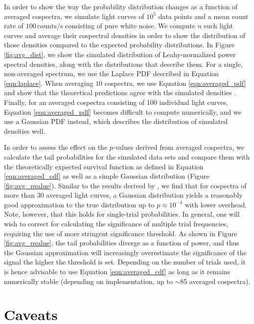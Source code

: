 \documentclass[12pt]{emulateapj}
\begin{document}
In order to show the way the probability distribution changes as a function of averaged cospectra, we simulate light curves of $10^{5}$ data points and a mean count rate of $100\,\mathrm{counts}/\mathrm{s}$ consisting of pure white noise. We compute $n$ such light curves and average their cospectral densities in order to show the distribution of those densities compared to the expected probability distributions. In Figure \ref{fig:avg_dist}, we show the simulated distribution of Leahy-normalized power spectral densities, along with the distributions that describe them. For a single, non-averaged spectrum, we use the Laplace PDF described in Equation \ref{eqn:laplace}. When averaging $10$ cospectra, we use Equation \ref{eqn:averaged_pdf} and show that the theoretical predictions agree with the simulated densities . Finally, for an averaged cospectra consisting of 100 individual light curves, Equation \ref{eqn:averaged_pdf} becomes difficult to compute numerically, and we use a Gaussian PDF instead, which describes the distribution of simulated densities well. 

In order to assess the effect on the $p$-values derived from averaged cospectra, we calculate the tail probabilities for the simulated data sets and compare them with the theoretically expected survival function as defined in Equation \ref{eqn:averaged_cdf} as well as a simple Gaussian distribution (Figure \ref{fig:avg_pvalue}). Similar to the results derived by \citet{balakrishnan1986}, we find that for cospectra of more than 30 averaged light curves, a Gaussian distribution yields a reasonably good approximation to the true distribution up to $p \approx 10^{-4}$ with lower overhead. Note, however, that this holds for single-trial probabilities. In general, one will wish to correct for calculating the significance of multiple trial frequencies, requiring the use of more stringent significance threshold. As shown in Figure \ref{fig:avg_pvalue}, the tail probabilities diverge as a function of power, and thus the Gaussian approximation will increasingly overestimate the significance of the signal the higher the threshold is set. Depending on the number of trials used, it is hence advisable to use Equation \ref{eqn:averaged_cdf} as long as it remains numerically stable (depending on implementation, up to $\sim$85 averaged cospectra).


\section{\textbf{Caveats}}
\end{document}
